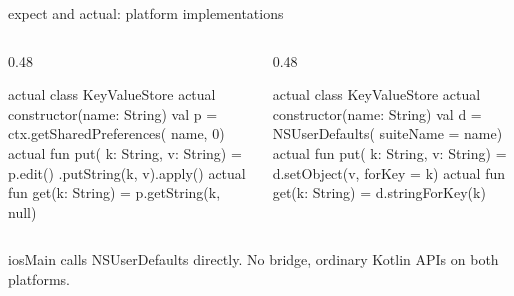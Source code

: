 \documentclass[10pt,aspectratio=169,t]{beamer}
\begin{document}
\begin{frame}[fragile,eyebrow=KMP]{expect and actual: platform implementations}
  \begin{columns}[T]
    \begin{column}{0.48\textwidth}
\begin{kotlin}[aboveskip=0mm,belowskip=0mm,framextopmargin=0.6mm,framexbottommargin=0.6mm]
actual class KeyValueStore
  actual constructor(name: String) {
  val p = ctx.getSharedPreferences(
      name, 0)
  actual fun put(
      k: String, v: String) =
      p.edit()
          .putString(k, v).apply()
  actual fun get(k: String) =
      p.getString(k, null)
}
\end{kotlin}
    \end{column}
    \begin{column}{0.48\textwidth}
\begin{kotlin}[aboveskip=0mm,belowskip=0mm,framextopmargin=0.6mm,framexbottommargin=0.6mm]
actual class KeyValueStore
  actual constructor(name: String) {
  val d = NSUserDefaults(
      suiteName = name)
  actual fun put(
      k: String, v: String) =
      d.setObject(v, forKey = k)
  actual fun get(k: String) =
      d.stringForKey(k)
}
\end{kotlin}
    \end{column}
  \end{columns}
  \begin{takeaway}{iosMain calls NSUserDefaults directly.}
    No bridge, ordinary Kotlin APIs on both platforms.
  \end{takeaway}
\end{frame}
\end{document}
